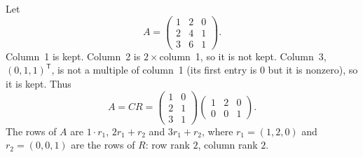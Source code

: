 \documentclass[10pt]{scrartcl}
\begin{document}
\begin{example*}
  Let
  \[
    A=\begin{pmatrix}1&2&0\\2&4&1\\3&6&1\end{pmatrix}.
  \]
  Column~1 is kept. Column~2 is $2\times$column~1, so it is not kept. Column~3, $(0,1,1)^{\mathsf T}$, is not a multiple of column~1 (its first entry is $0$ but it is nonzero), so it is kept. Thus
  \[
    A=CR=\begin{pmatrix}1&0\\2&1\\3&1\end{pmatrix}\begin{pmatrix}1&2&0\\0&0&1\end{pmatrix}.
  \]
  The rows of $A$ are $1\cdot r_1$, $2r_1+r_2$ and $3r_1+r_2$, where $r_1=(1,2,0)$ and $r_2=(0,0,1)$ are the rows of $R$: row rank $2$, column rank $2$.
\end{example*}
\end{document}
